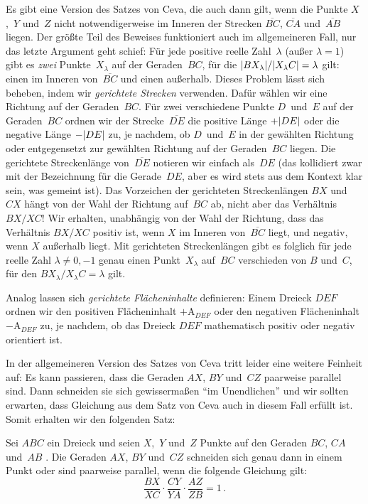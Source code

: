 Es gibt eine Version des Satzes von Ceva, die auch dann gilt, wenn die Punkte $X$,~$Y$ und~$Z$ nicht notwendigerweise im Inneren der Strecken $\overline{BC}$, $\overline{CA}$ und~$\overline{AB}$ liegen. Der größte Teil des Beweises funktioniert auch im allgemeineren Fall, nur das letzte Argument geht schief: Für jede positive reelle Zahl~$\lambda$ (außer $\lambda=1$) gibt es \emph{zwei} Punkte~$X_\lambda$ auf der Geraden~$BC$, für die $\lvert BX_\lambda\rvert/\lvert X_\lambda C\rvert=\lambda$ gilt: einen im Inneren von~$\overline{BC}$ und einen außerhalb. Dieses Problem lässt sich beheben, indem wir \emph{gerichtete Strecken} verwenden. Dafür wählen wir eine Richtung auf der Geraden~$BC$. Für zwei verschiedene Punkte $D$~und~$E$ auf der Geraden~$BC$ ordnen wir der Strecke~$\overline{DE}$ die positive Länge $+\lvert DE\rvert$ oder die negative Länge $-\lvert DE\rvert$ zu, je nachdem, ob $D$~und~$E$ in der gewählten Richtung oder entgegensetzt zur gewählten Richtung auf der Geraden~$BC$ liegen. Die gerichtete Streckenlänge von~$\overline{DE}$ notieren wir einfach als~$DE$ (das kollidiert zwar mit der Bezeichnung für die Gerade~$DE$, aber es wird stets aus dem Kontext klar sein, was gemeint ist). Das Vorzeichen der gerichteten Streckenlängen $BX$ und~$CX$ hängt von der Wahl der Richtung auf~$BC$ ab, nicht aber das Verhältnis $BX/XC$! Wir erhalten, unabhängig von der Wahl der Richtung, dass das Verhältnis $BX/XC$ positiv ist, wenn $X$ im Inneren von~$\overline{BC}$ liegt, und negativ, wenn $X$ außerhalb liegt. Mit gerichteten Streckenlängen gibt es folglich für jede reelle Zahl $\lambda\neq 0,-1$ genau einen Punkt~$X_\lambda$ auf~$BC$ verschieden von $B$ und~$C$, für den $BX_\lambda/X_\lambda C=\lambda$ gilt.

Analog lassen sich \emph{gerichtete Flächeninhalte} definieren: Einem Dreieck $DEF$ ordnen wir den positiven Flächeninhalt $+\mathrm{A}_{DEF}$ oder den negativen Flächeninhalt $-\mathrm{A}_{DEF}$ zu, je nachdem, ob das Dreieck $DEF$ mathematisch positiv oder negativ orientiert ist.

In der allgemeineren Version des Satzes von Ceva tritt leider eine weitere Feinheit auf:
Es kann passieren, dass die Geraden $AX$, $BY$ und~$CZ$ paarweise parallel sind. Dann schneiden sie sich gewissermaßen \enquote{im Unendlichen} und wir sollten erwarten, dass Gleichung aus dem Satz von Ceva auch in diesem Fall erfüllt ist. Somit erhalten wir den folgenden Satz:

\begin{satzmitnamen}
	Sei $ABC$ ein Dreieck und seien $X$,~$Y$ und~$Z$ Punkte auf den Geraden $BC$, $CA$ und~$AB$ . Die Geraden $AX$, $BY$ und~$CZ$ schneiden sich genau dann in einem Punkt oder sind paarweise parallel, wenn die folgende Gleichung  gilt:
	\begin{equation*}%
		\frac{BX}{XC}\cdot \frac{CY}{YA}\cdot \frac{AZ}{ZB}=1\,.
	\end{equation*}
\end{satzmitnamen}

